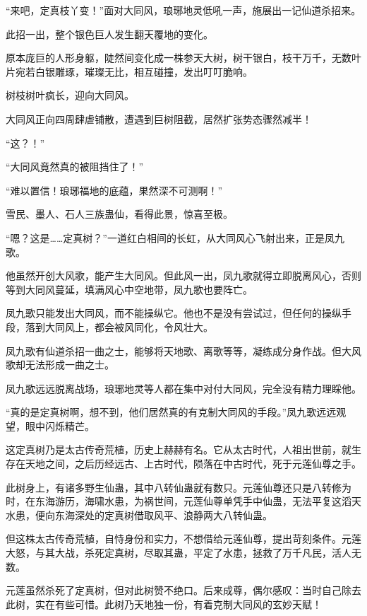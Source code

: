 
\begin{this_body}

“来吧，定真枝丫变！”面对大同风，琅琊地灵低吼一声，施展出一记仙道杀招来。

此招一出，整个银色巨人发生翻天覆地的变化。

原本庞巨的人形身躯，陡然间变化成一株参天大树，树干银白，枝干万千，无数叶片宛若白银雕琢，璀璨无比，相互碰撞，发出叮叮脆响。

树枝树叶疯长，迎向大同风。

大同风正向四周肆虐铺散，遭遇到巨树阻截，居然扩张势态骤然减半！

“这？！”

“大同风竟然真的被阻挡住了！”

“难以置信！琅琊福地的底蕴，果然深不可测啊！”

雪民、墨人、石人三族蛊仙，看得此景，惊喜至极。

“嗯？这是……定真树？”一道红白相间的长虹，从大同风心飞射出来，正是凤九歌。

他虽然开创大风歌，能产生大同风。但此风一出，凤九歌就得立即脱离风心，否则等到大同风蔓延，填满风心中空地带，凤九歌也要阵亡。

凤九歌只能发出大同风，而不能操纵它。他也不是没有尝试过，但任何的操纵手段，落到大同风上，都会被风同化，令风壮大。

凤九歌有仙道杀招一曲之士，能够将天地歌、离歌等等，凝练成分身作战。但大风歌却无法形成一曲之士。

凤九歌远远脱离战场，琅琊地灵等人都在集中对付大同风，完全没有精力理睬他。

“真的是定真树啊，想不到，他们居然真的有克制大同风的手段。”凤九歌远远观望，眼中闪烁精芒。

这定真树乃是太古传奇荒植，历史上赫赫有名。它从太古时代，人祖出世前，就生存在天地之间，之后历经远古、上古时代，陨落在中古时代，死于元莲仙尊之手。

此树身上，有诸多野生仙蛊，其中八转仙蛊就有数只。元莲仙尊还只是八转修为时，在东海游历，海啸水患，为祸世间，元莲仙尊单凭手中仙蛊，无法平复这滔天水患，便向东海深处的定真树借取风平、浪静两大八转仙蛊。

但这株太古传奇荒植，自恃身份和实力，不想借给元莲仙尊，提出苛刻条件。元莲大怒，与其大战，杀死定真树，尽取其蛊，平定了水患，拯救了万千凡民，活人无数。

元莲虽然杀死了定真树，但对此树赞不绝口。后来成尊，偶尔感叹：当时自己除去此树，实在有些可惜。此树乃天地独一份，有着克制大同风的玄妙天赋！


\end{this_body}
